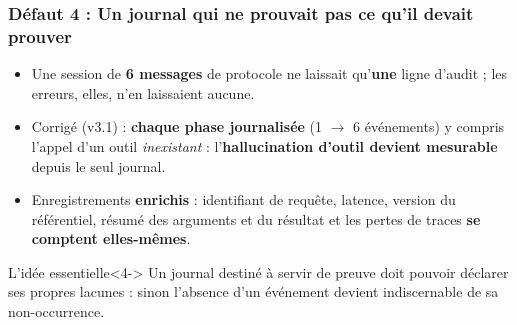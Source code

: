 \documentclass[aspectratio=169,11pt]{beamer}
\begin{document}
\begin{frame}
  \frametitle{Défaut 4 : Un journal qui ne prouvait pas ce qu'il devait prouver}
  \vspace{0.1cm}
  \begin{itemize}\setlength\itemsep{0.45em}
    \item Une session de \textbf{6 messages} de protocole ne laissait
      qu'\textbf{une} ligne d'audit ; les erreurs, elles, n'en laissaient
      aucune.
    \item<2-> Corrigé (v3.1) : \textbf{chaque phase journalisée} (1
      $\rightarrow$ 6 événements) y compris l'appel d'un outil
      \emph{inexistant} : l'\textbf{hallucination d'outil devient mesurable}
      depuis le seul journal.
    \item<3-> Enregistrements \textbf{enrichis} : identifiant de requête,
      latence, version du référentiel, résumé des arguments et du résultat
      et les pertes de traces \textbf{se comptent elles-mêmes}.
  \end{itemize}
  \vspace{0.25cm}
  \begin{block}{L'idée essentielle}<4->
    Un journal destiné à servir de preuve doit pouvoir déclarer ses
    propres lacunes : sinon l'absence d'un événement devient indiscernable
    de sa non-occurrence.
  \end{block}
\end{frame}
 
\end{document}
